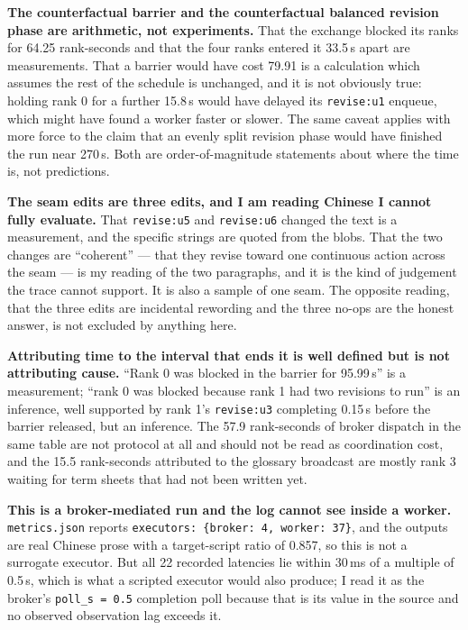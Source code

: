 \documentclass[11pt]{article}
\begin{document}
\textbf{The counterfactual barrier and the counterfactual balanced revision phase are
arithmetic, not experiments.} That the exchange blocked its ranks for 64.25 rank-seconds and that
the four ranks entered it 33.5\,s apart are measurements. That a barrier would have cost 79.91 is
a calculation which assumes the rest of the schedule is unchanged, and it is not obviously true:
holding rank 0 for a further 15.8\,s would have delayed its \texttt{revise:u1} enqueue, which
might have found a worker faster or slower. The same caveat applies with more force to the claim
that an evenly split revision phase would have finished the run near 270\,s. Both are
order-of-magnitude statements about where the time is, not predictions.

\textbf{The seam edits are three edits, and I am reading Chinese I cannot fully evaluate.} That
\texttt{revise:u5} and \texttt{revise:u6} changed the text is a measurement, and the specific
strings are quoted from the blobs. That the two changes are ``coherent'' --- that they revise
toward one continuous action across the seam --- is my reading of the two paragraphs, and it is
the kind of judgement the trace cannot support. It is also a sample of one seam. The opposite
reading, that the three edits are incidental rewording and the three no-ops are the honest
answer, is not excluded by anything here.

\textbf{Attributing time to the interval that ends it is well defined but is not attributing
cause.} ``Rank 0 was blocked in the barrier for 95.99\,s'' is a measurement; ``rank 0 was blocked
because rank 1 had two revisions to run'' is an inference, well supported by rank 1's
\texttt{revise:u3} completing 0.15\,s before the barrier released, but an inference. The 57.9
rank-seconds of broker dispatch in the same table are not protocol at all and should not be read
as coordination cost, and the 15.5 rank-seconds attributed to the glossary broadcast are mostly
rank 3 waiting for term sheets that had not been written yet.

\textbf{This is a broker-mediated run and the log cannot see inside a worker.}
\texttt{metrics.json} reports \texttt{executors: \{broker: 4, worker: 37\}}, and the outputs are
real Chinese prose with a target-script ratio of 0.857, so this is not a surrogate executor. But
all 22 recorded latencies lie within 30\,ms of a multiple of 0.5\,s, which is what a scripted
executor would also produce; I read it as the broker's \texttt{poll\_s = 0.5} completion poll
because that is its value in the source and no observed observation lag exceeds it.
\end{document}
